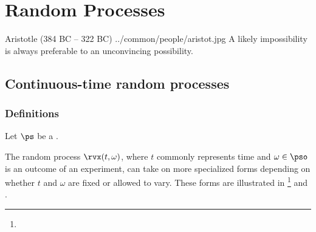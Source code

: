 
\chapter{Random Processes}
\label{app:random_processes}
\qboxnps
  {Aristotle (384 BC -- 322 BC)
    \footnotemark
  }
  {../common/people/aristot.jpg}
  {A likely impossibility is always preferable to an
  unconvincing possibility.}



\section{Continuous-time random processes}
\subsection{Definitions}
\begin{definition}
Let $\ps$ be a .\\
\end{definition}

The random process $\rvx(t,\omega)$, where $t$ commonly represents time
and $\omega\in\pso$ is an outcome of an experiment,
can take on more specialized forms depending on whether
$t$ and $\omega$ are fixed or allowed to vary.
These forms are illustrated in \footnote{}
and .

